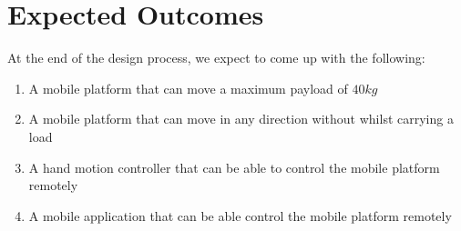 \section{Expected Outcomes}
At the end of the design process, we expect to come up with the following:
\begin{enumerate}
    \item A mobile platform that can move a maximum payload of $40kg$
    \item A mobile platform that can move in any direction without whilst carrying a load
    \item A hand motion controller that can be able to control the mobile platform remotely
    \item A mobile application that can be able control the mobile platform remotely
\end{enumerate}